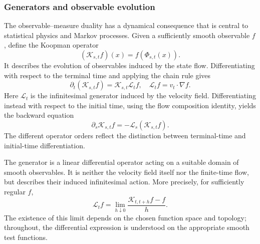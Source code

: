 \documentclass[12pt,a4paper,oneside]{book}
\begin{document}
\subsubsection{Generators and observable evolution}

The observable--measure duality has a dynamical consequence that is central to statistical physics and Markov processes.
Given a sufficiently smooth observable $f$, define the Koopman operator
\begin{equation*}
    (\mathcal{K}_{s,t}f)(x)=f(\Phi_{s,t}(x)).
\end{equation*}
It describes the evolution of observables induced by the state flow. Differentiating with respect to the terminal time and
applying the chain rule gives
\begin{equation*}
    \partial_t(\mathcal{K}_{s,t}f) = \mathcal{K}_{s,t}\mathcal L_t f,\quad \mathcal L_t f=v_t\cdot\nabla f.
\end{equation*}
Here $\mathcal L_t$ is the infinitesimal generator induced by the velocity field. Differentiating instead with respect to
the initial time, using the flow composition identity, yields the backward equation
\begin{equation*}
    \partial_s\mathcal{K}_{s,t}f = -\mathcal L_s(\mathcal{K}_{s,t}f).
\end{equation*}
The different operator orders reflect the distinction between terminal-time and initial-time differentiation.

The generator is a linear differential operator acting on a suitable domain of smooth observables. It is neither the velocity
field itself nor the finite-time flow, but describes their induced infinitesimal action. More precisely, for sufficiently
regular $f$,
\begin{equation*}
    \mathcal L_t f = \lim_{h\downarrow0} \frac{\mathcal{K}_{t,t+h}f-f}{h}.
\end{equation*}
The existence of this limit depends on the chosen function space and topology; throughout, the differential expression is
understood on the appropriate smooth test functions.
\end{document}
